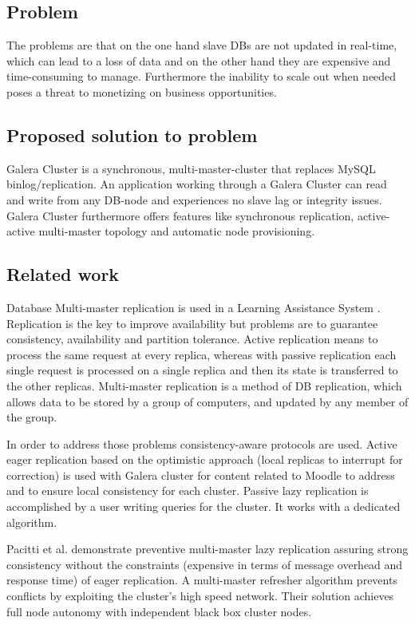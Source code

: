 \documentclass{sig-alternate}
\begin{document}
\bigskip

\subsection{Problem}
The problems are that on the one hand slave DBs are not updated in real-time, which can lead to a loss of data and on the other hand they are expensive and time-consuming to manage. Furthermore the inability to scale out when needed poses a threat to monetizing on business opportunities.

\subsection{Proposed solution to problem}
Galera Cluster is a synchronous, multi-master-cluster that replaces MySQL binlog/replication. An application working through a Galera Cluster can read and write from any DB-node and experiences no slave lag or integrity issues. Galera Cluster furthermore offers features like synchronous replication, active-active multi-master topology and automatic node provisioning.

\subsection{Related work}
Database Multi-master replication is used in a Learning Assistance System \cite{gautam2016multi}. Replication is the key to improve availability but problems are to guarantee consistency, availability and partition tolerance.
Active replication means to process the same request at every replica, whereas with passive replication each single request is processed on a single replica and then its state is transferred to the other replicas.
Multi-master replication is a method of DB replication, which allows data to be stored by a group of computers, and updated by any member of the group.

In order to address those problems consistency-aware protocols are used. Active eager replication based on the optimistic approach (local replicas to interrupt for correction) is used with Galera cluster for content related to Moodle to address and to ensure local consistency for each cluster. Passive lazy replication is accomplished by a user writing queries for the cluster. It works with a dedicated algorithm. 

Pacitti et al. \cite{pacitti2003preventive} demonstrate preventive multi-master lazy replication assuring strong consistency without the constraints (expensive in terms of message overhead and response time) of eager replication. A multi-master refresher algorithm prevents conflicts by exploiting the cluster’s high speed network. Their solution achieves full node autonomy with independent black box cluster nodes.
\end{document}
